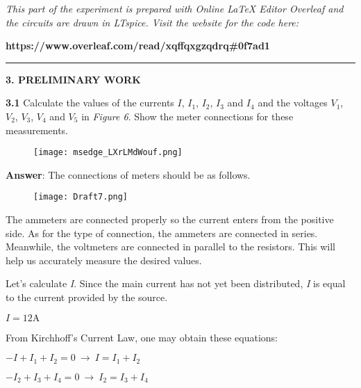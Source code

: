 \documentclass{article}
\begin{document}
{\large \textit{This part of the experiment is prepared with Online LaTeX Editor Overleaf and the circuits are drawn in LTspice. Visit the website for the code here:}}

{\large \textbf{https://www.overleaf.com/read/xqffqxgzqdrq\#0f7ad1}}
\vspace{4mm}
\hrule
\vspace{4mm}
{\textbf{\Large 3. PRELIMINARY WORK}}

\vspace{4mm}

{\Large \textbf{3.1} Calculate the values of the currents $I$, $I_{1}$, $I_{2}$, $I_{3}$ and $I_{4}$ and the voltages $V_{1}$, $V_{2}$, $V_{3}$, $V_{4}$ and $V_{5}$ in \textit{Figure 6}. Show the meter connections for these measurements.}

\begin{figure}[H]
    \centering
    \texttt{[image: msedge\_LXrLMdWouf.png]}
\end{figure}

{\Large \textbf{Answer}: The connections of meters should be as follows.}

\begin{figure}[H]
    \centering
    \texttt{[image: Draft7.png]}
\end{figure}

\vspace{4mm}

{\Large The ammeters are connected properly so the current enters from the positive side. As for the type of connection, the ammeters are connected in series. Meanwhile, the voltmeters are connected in parallel to the resistors. This will help us accurately measure the desired values.}

{\Large  Let's calculate \textit{I}. Since the main current has not yet been distributed, \textit{I} is equal to the current provided by the source.}

\vspace{4mm}

{\Large $\boxed{I = 12 \text{A}}$}

\vspace{4mm}

{\Large From Kirchhoff's Current Law, one may obtain these equations:}

\vspace{4mm}

{\Large $-I + I_1 + I_2 = 0 \ \rightarrow \ I = I_1 + I_2 $}

{\Large $-I_2 + I_3 + I_4 = 0 \ \rightarrow \ I_2 = I_3 + I_4 $}
\end{document}
